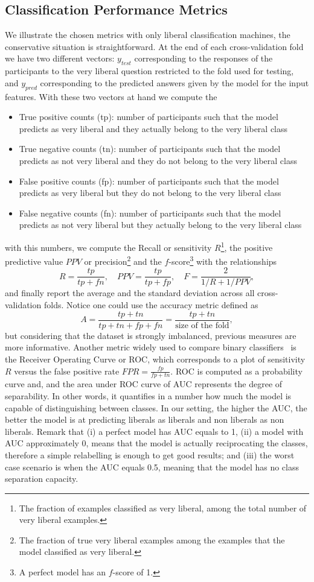 \documentclass[10pt,leqno]{amsart}
\begin{document}
\subsection{Classification Performance Metrics} We illustrate the chosen metrics with only liberal classification machines, the conservative situation is straightforward. At the end of each cross-validation fold we have two different vectors: $y_{test}$ corresponding to the responses of the participants to the very liberal question restricted to the fold used for testing, and $y_{pred}$ corresponding to the predicted answers given by the model for the input features. With these two vectors at hand we compute the 
\begin{itemize}
\item True positive counts (tp): number of participants such that the model predicts as very liberal and they actually belong to the very liberal class
\item True negative counts (tn): number of participants such that the model predicts as not very liberal and they do not belong to the very liberal class
\item False positive counts (fp): number of participants such that the model predicts as very liberal but they do not belong to the very liberal class
\item False negative counts (fn): number of participants such that the model predicts as not very liberal but they actually belong to the very liberal class
\end{itemize}
with this numbers, we compute the Recall or sensitivity $R$\footnote{The fraction of examples classified as very liberal, among the total number of very liberal examples.}, the positive predictive value $PPV$ or precision\footnote{The fraction of true very liberal examples among the examples that the model classified as very liberal.} and the $f$-score\footnote{A perfect model has an $f$-score of 1.} with the relationships
$$
R=\frac{tp}{tp+fn},\quad PPV=\frac{tp}{tp+fp},\quad F=\frac{2}{1/R+1/PPV},
$$
and finally report the average and the standard deviation across all cross-validation folds. Notice one could use the accuracy metric defined as
$$
A = \frac{tp+tn}{tp+tn+fp+fn}=\frac{tp+tn}{\text{size of the fold}},
$$
but considering that the dataset is strongly imbalanced, previous measures are more informative. Another metric widely used to compare binary classifiers~\cite{wolff2019machine,artetxe2020balanced} is the Receiver Operating Curve or ROC, which corresponds to a plot of sensitivity $R$ versus the false positive rate
$
FPR = \frac{fp}{fp+tn}.
$
ROC is computed as a probability curve and, and the area under ROC curve of AUC represents the degree of separability. In other words, it quantifies in a number how much the model is capable of distinguishing between classes. In our setting, the higher the AUC, the better the model is at predicting liberals as liberals and non liberals as non liberals. Remark that (i) a perfect model has AUC equals to 1, (ii) a model with AUC approximately 0, means that the model is actually reciprocating the classes, therefore a simple relabelling is enough to get good results; and (iii) the worst case scenario is when the AUC equals 0.5, meaning that the model has no class separation capacity.
\end{document}
